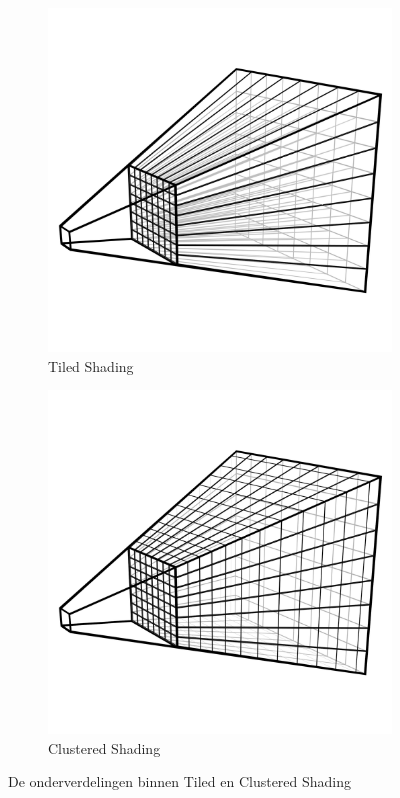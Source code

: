 \begin{figure}[t]
  \centering
  \begin{subfigure}[b]{.45\textwidth}
    \includegraphics[width=\textwidth]{./img/raw/ts-grid-intro/frustum-opdeling.png}
    \caption{Tiled Shading}
    \label{fig:hs-tiled-clustered-subd-tiled}
  \end{subfigure} \quad
  \begin{subfigure}[b]{.45\textwidth}
    \includegraphics[width=\textwidth]{./img/raw/cs-opdeling-frustum2.png}
    \caption{Clustered Shading}
    \label{fig:hs-tiled-clustered-subd-clustered}
  \end{subfigure}
  \caption{De onderverdelingen binnen Tiled en Clustered Shading}
  \label{fig:hs-tiled-clustered-subd}
\end{figure}
